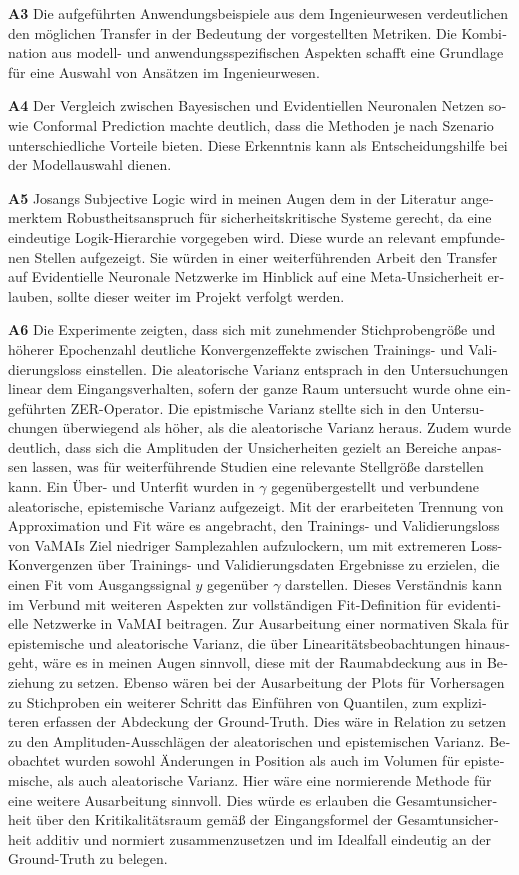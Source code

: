 \begin{otherlanguage}{ngerman}
\textbf{A3} Die aufgeführten Anwendungsbeispiele aus dem Ingenieurwesen verdeutlichen den möglichen Transfer in der Bedeutung der vorgestellten Metriken. Die Kombination aus modell- und anwendungsspezifischen Aspekten schafft eine Grundlage für eine Auswahl von Ansätzen im Ingenieurwesen.

\textbf{A4} Der Vergleich zwischen Bayesischen und Evidentiellen Neuronalen Netzen sowie Conformal Prediction machte deutlich, dass die Methoden je nach Szenario unterschiedliche Vorteile bieten. Diese Erkenntnis kann als Entscheidungshilfe bei der Modellauswahl dienen.

\textbf{A5} Josangs \glqq{}Subjective Logic\grqq{} wird in meinen Augen dem in der Literatur angemerktem Robustheitsanspruch für sicherheitskritische Systeme gerecht, da eine eindeutige Logik-Hierarchie vorgegeben wird. Diese wurde an relevant empfundenen Stellen aufgezeigt. Sie würden in einer weiterführenden Arbeit den Transfer auf Evidentielle Neuronale Netzwerke im Hinblick auf eine Meta-Unsicherheit erlauben, sollte dieser weiter im Projekt verfolgt werden.

\textbf{A6} Die Experimente zeigten, dass sich mit zunehmender Stichprobengröße und höherer Epochenzahl deutliche Konvergenzeffekte zwischen Trainings- und Validierungsloss einstellen. Die aleatorische Varianz entsprach in den Untersuchungen linear dem Eingangsverhalten, sofern der ganze Raum untersucht wurde ohne eingeführten ZER-Operator. Die epistmische Varianz stellte sich in den Untersuchungen überwiegend als höher, als die aleatorische Varianz heraus. Zudem wurde deutlich, dass sich die Amplituden der Unsicherheiten gezielt an Bereiche anpassen lassen, was für weiterführende Studien eine relevante Stellgröße darstellen kann. Ein Über- und Unterfit wurden in $\gamma$ gegenübergestellt und verbundene aleatorische, epistemische Varianz aufgezeigt. Mit der erarbeiteten Trennung von Approximation und Fit wäre es angebracht, den Trainings- und Validierungsloss von VaMAIs Ziel niedriger Samplezahlen aufzulockern, um mit extremeren Loss-Konvergenzen über Trainings- und Validierungsdaten Ergebnisse zu erzielen, die einen Fit vom Ausgangssignal $y$ gegenüber $\gamma$ darstellen. Dieses Verständnis kann im Verbund mit weiteren Aspekten zur vollständigen Fit-Definition für evidentielle Netzwerke in VaMAI beitragen. Zur Ausarbeitung einer normativen Skala für epistemische und aleatorische Varianz, die über Linearitätsbeobachtungen hinausgeht, wäre es in meinen Augen sinnvoll, diese mit der Raumabdeckung aus in Beziehung zu setzen. Ebenso wären bei der Ausarbeitung der Plots für Vorhersagen zu Stichproben ein weiterer Schritt das Einführen von Quantilen, zum expliziteren erfassen der Abdeckung der Ground-Truth. Dies wäre in Relation zu setzen zu den Amplituden-Ausschlägen der aleatorischen und epistemischen Varianz. Beobachtet wurden sowohl Änderungen in Position als auch im Volumen für epistemische, als auch aleatorische Varianz. Hier wäre eine normierende Methode für eine weitere Ausarbeitung sinnvoll. Dies würde es erlauben die Gesamtunsicherheit über den Kritikalitätsraum gemäß der Eingangsformel der Gesamtunsicherheit additiv und normiert zusammenzusetzen und im Idealfall eindeutig an der Ground-Truth zu belegen.



\end{otherlanguage}
